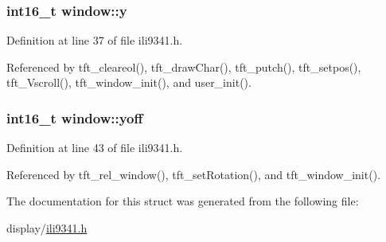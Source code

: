 \hypertarget{structwindow_a95c7023fc42e79ab42c291b90a490776}{
\subsubsection[{y}]{\setlength{\rightskip}{0pt plus 5cm}int16\-\_\-t window\-::y}}\label{structwindow_a95c7023fc42e79ab42c291b90a490776}


Definition at line 37 of file ili9341.\-h.



Referenced by tft\-\_\-cleareol(), tft\-\_\-draw\-Char(), tft\-\_\-putch(), tft\-\_\-setpos(), tft\-\_\-\-Vscroll(), tft\-\_\-window\-\_\-init(), and user\-\_\-init().

\hypertarget{structwindow_a95c482caa25e4a283d962643d410bc29}{
\subsubsection[{yoff}]{\setlength{\rightskip}{0pt plus 5cm}int16\-\_\-t window\-::yoff}}\label{structwindow_a95c482caa25e4a283d962643d410bc29}


Definition at line 43 of file ili9341.\-h.



Referenced by tft\-\_\-rel\-\_\-window(), tft\-\_\-set\-Rotation(), and tft\-\_\-window\-\_\-init().



The documentation for this struct was generated from the following file\-:\begin{DoxyCompactItemize}
\item 
display/\hyperlink{ili9341_8h}{ili9341.\-h}\end{DoxyCompactItemize}
